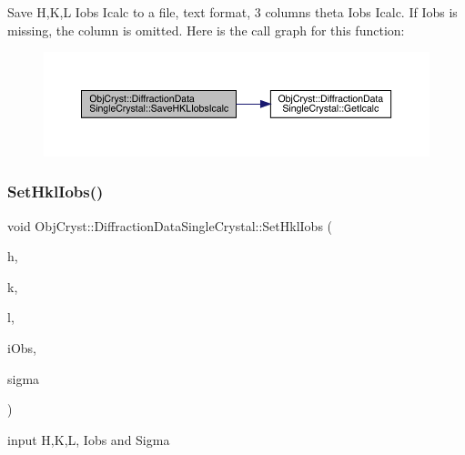 Save H,K,L Iobs Icalc to a file, text format, 3 columns theta Iobs Icalc. If Iobs is missing, the column is omitted. Here is the call graph for this function\+:
\nopagebreak
\begin{figure}[H]
\begin{center}
\leavevmode
\includegraphics[width=350pt]{class_obj_cryst_1_1_diffraction_data_single_crystal_af220156c564b8d602b0c05ba222fba03_cgraph}
\end{center}
\end{figure}
\mbox{\label{class_obj_cryst_1_1_diffraction_data_single_crystal_a0d13ab934c60c9bd0aebbb285a92c5cb}} 
\subsubsection{\texorpdfstring{SetHklIobs()}{SetHklIobs()}}
{\footnotesize\ttfamily void Obj\+Cryst\+::\+Diffraction\+Data\+Single\+Crystal\+::\+Set\+Hkl\+Iobs (\begin{DoxyParamCaption}\item[{const Cryst\+Vector\+\_\+long \&}]{h,  }\item[{const Cryst\+Vector\+\_\+long \&}]{k,  }\item[{const Cryst\+Vector\+\_\+long \&}]{l,  }\item[{const Cryst\+Vector\+\_\+\+R\+E\+AL \&}]{i\+Obs,  }\item[{const Cryst\+Vector\+\_\+\+R\+E\+AL \&}]{sigma }\end{DoxyParamCaption})}



input H,K,L, Iobs and Sigma 


